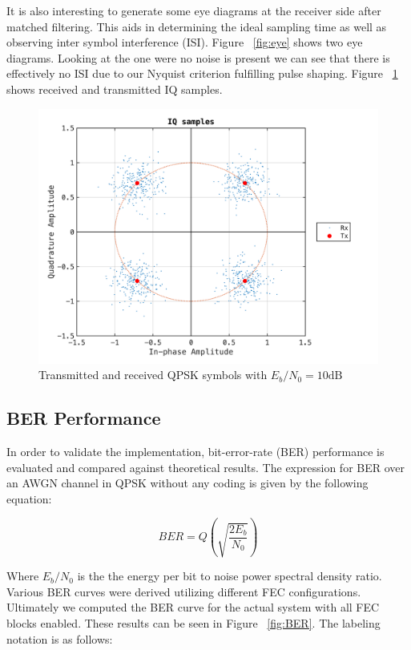 \documentclass[paper=a4, fontsize=11pt]{scrartcl}	%
\numberwithin{equation}{section}		%
\numberwithin{figure}{section}			%
\numberwithin{table}{section}			%
\begin{document}
It is also interesting to generate some eye diagrams at the receiver side after matched filtering. This aids in determining the ideal sampling time as well as observing inter symbol interference (ISI). Figure ~\ref{fig:eye} shows two eye diagrams. Looking at the one were no noise is present we can see that there is effectively no ISI due to our Nyquist criterion fulfilling pulse shaping. Figure ~\ref{fig:Constellation} shows received and transmitted IQ samples.


\begin{figure}[htb]
\centering
\includegraphics[scale=0.40]{matp_Constellation10dB.png}
\caption{Transmitted and received QPSK symbols with $E_b/N_0 = 10\text{dB}$  }\label{fig:Constellation}
\end{figure}


\subsection{BER Performance}

In order to validate the implementation, bit-error-rate (BER) performance is evaluated and compared against theoretical results. The expression for BER over an AWGN channel in QPSK without any coding is given by the following equation:

\begin{equation} \label{eq:qpskBer}
BER = Q\left(\sqrt{\frac{2E_b}{N_0}}\right)
\end{equation}

Where $E_b/N_0$ is the the energy per bit to noise power spectral density ratio. Various BER curves were derived utilizing different FEC configurations. Ultimately we computed the BER curve for the actual system with all FEC blocks enabled. These results can be seen in Figure ~\ref{fig:BER}. The labeling notation is as follows:
\end{document}

